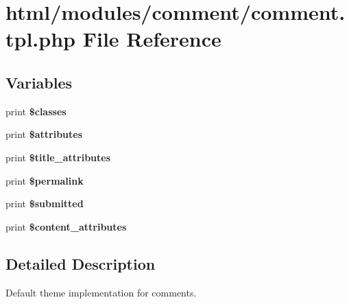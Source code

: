 \hypertarget{modules_2comment_2comment_8tpl_8php}{
\section{html/modules/comment/comment.tpl.php File Reference}
\label{modules_2comment_2comment_8tpl_8php}
}
\subsection*{Variables}
\begin{DoxyCompactItemize}
\item 
\hypertarget{modules_2comment_2comment_8tpl_8php_a6d48ecbdbc70ca1812e665169b5fa1e2}{
print {\bfseries \$classes}}
\label{modules_2comment_2comment_8tpl_8php_a6d48ecbdbc70ca1812e665169b5fa1e2}

\item 
\hypertarget{modules_2comment_2comment_8tpl_8php_a9c88c4272fa40546577b45392a0b3cd3}{
print {\bfseries \$attributes}}
\label{modules_2comment_2comment_8tpl_8php_a9c88c4272fa40546577b45392a0b3cd3}

\item 
\hypertarget{modules_2comment_2comment_8tpl_8php_a938746e3da4238c45247505b2d7bd89f}{
print {\bfseries \$title\_\-attributes}}
\label{modules_2comment_2comment_8tpl_8php_a938746e3da4238c45247505b2d7bd89f}

\item 
\hypertarget{modules_2comment_2comment_8tpl_8php_aa6e866865d65b663d634e32df9f1d64a}{
print {\bfseries \$permalink}}
\label{modules_2comment_2comment_8tpl_8php_aa6e866865d65b663d634e32df9f1d64a}

\item 
\hypertarget{modules_2comment_2comment_8tpl_8php_ae85ca26e14730f19b36558d432c90201}{
print {\bfseries \$submitted}}
\label{modules_2comment_2comment_8tpl_8php_ae85ca26e14730f19b36558d432c90201}

\item 
\hypertarget{modules_2comment_2comment_8tpl_8php_ae2ee2e16f11937564281332a76a658e8}{
print {\bfseries \$content\_\-attributes}}
\label{modules_2comment_2comment_8tpl_8php_ae2ee2e16f11937564281332a76a658e8}

\end{DoxyCompactItemize}


\subsection{Detailed Description}
Default theme implementation for comments.

